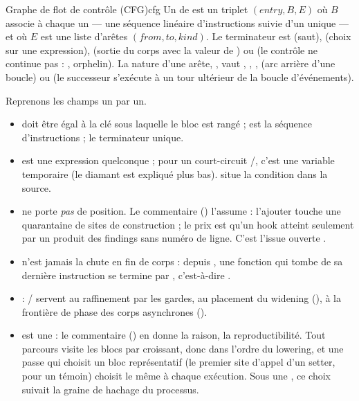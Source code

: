 \begin{definition}{Graphe de flot de contrôle (CFG)}{cfg}
Un  de \reactant{} est un triplet $(\mathit{entry}, B, E)$ où $B$ associe à chaque  un  --- une séquence linéaire d'instructions  suivie d'un unique  --- et où $E$ est une liste d'arêtes $(\mathit{from}, \mathit{to}, \mathit{kind})$. Le terminateur est  (saut),  (choix sur une expression),  (sortie du corps avec la valeur de ) ou  (le contrôle ne continue pas : ,  orphelin). La nature d'une arête, , vaut , , ,  (arc arrière d'une boucle) ou  (le successeur s'exécute à un tour ultérieur de la boucle d'événements).
\end{definition}

Reprenons les champs un par un.

\begin{itemize}
  \item {} doit être égal à la clé sous laquelle le bloc est rangé ;  est la séquence d'instructions ;  le terminateur unique.
  \item {} est une expression quelconque ; pour un court-circuit \code{&&}/\code{||}, c'est une variable temporaire  (le diamant est expliqué plus bas).  situe la condition dans la source.
  \item {} ne porte \emph{pas} de position. Le commentaire () l'assume : l'ajouter touche une quarantaine de sites de construction ; le prix est qu'un hook atteint seulement par un  produit des findings sans numéro de ligne. C'est l'issue ouverte .
  \item {} n'est jamais la chute en fin de corps : depuis , une fonction qui \og tombe\fg{} de sa dernière instruction se termine par , c'est-à-dire .
  \item {} : / servent au raffinement par les gardes,  au placement du widening (),  à la frontière de phase des corps asynchrones ().
  \item {} est une  : le commentaire () en donne la raison, la reproductibilité. Tout parcours visite les blocs par  croissant, donc dans l'ordre du lowering, et une passe qui choisit un bloc \og représentatif\fg{} (le premier site d'appel d'un setter, pour un témoin) choisit le même à chaque exécution. Sous une , ce choix suivait la graine de hachage du processus.
\end{itemize}

